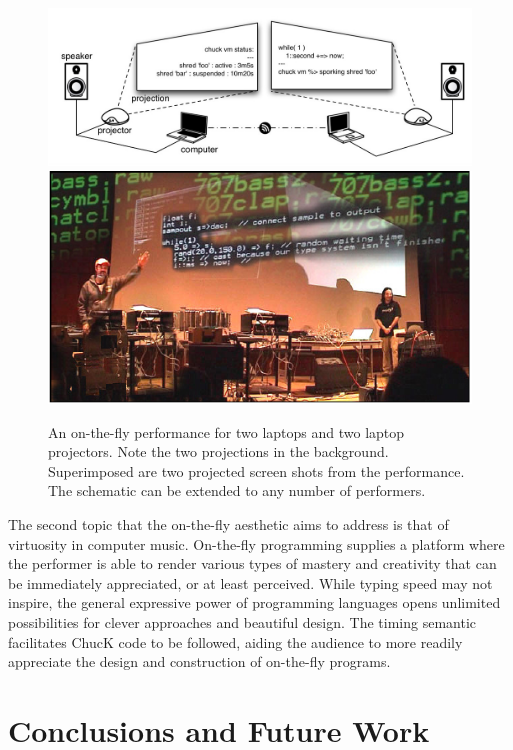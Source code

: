 \begin{figure}[t]
\centering
\includegraphics[width=\textwidth]{img-2-eps-converted-to-crop.pdf}
\includegraphics[width=\textwidth]{img-3-eps-converted-to-crop.pdf}
\caption{An on-the-fly performance for two laptops and two laptop
projectors. Note the two projections in the background.  Superimposed are two
projected screen shots from the performance. The schematic can be extended to any
number of performers.}
\label{Wang:img-3}
\end{figure}


The second topic that the on-the-fly aesthetic aims to address is that of
virtuosity in computer music.  On-the-fly programming supplies a platform where
the performer is able to render various types of mastery and creativity that can
be immediately appreciated, or at least perceived.  While typing speed may not
inspire, the general expressive power of programming languages opens unlimited
possibilities for clever approaches and beautiful design.  The timing semantic
facilitates ChucK code to be followed, aiding the audience to more readily
appreciate the design and construction of on-the-fly programs.

\section{Conclusions and Future Work}

